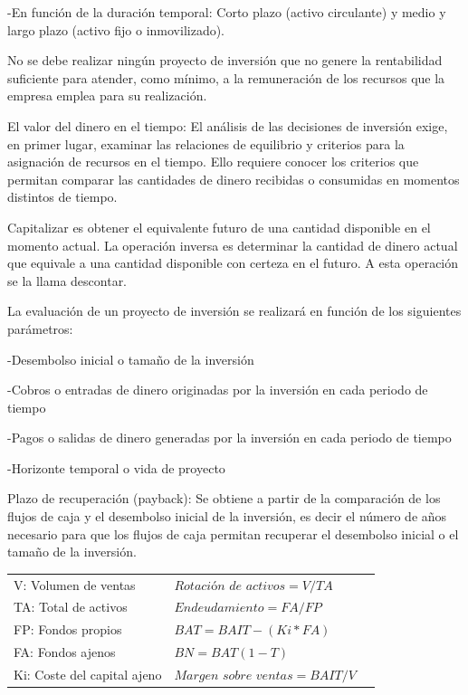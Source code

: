 \documentclass[12pt, twoside, openright]{report} %
\begin{document}
-En función de la duración temporal: Corto plazo (activo circulante) y medio y largo plazo (activo fijo o
inmovilizado).

No se debe realizar ningún proyecto de inversión que no genere la rentabilidad suficiente para atender, como
mínimo, a la remuneración de los recursos que la empresa emplea para su realización.

El valor del dinero en el tiempo: El análisis de las decisiones de inversión exige, en primer lugar, examinar
las relaciones de equilibrio y criterios para la asignación de recursos en el tiempo. Ello requiere conocer los
criterios que permitan comparar las cantidades de dinero recibidas o consumidas en momentos distintos de
tiempo.

Capitalizar es obtener el equivalente futuro de una cantidad disponible en el momento actual. La operación
inversa es determinar la cantidad de dinero actual que equivale a una cantidad disponible con certeza en el
futuro. A esta operación se la llama descontar.

La evaluación de un proyecto de inversión se realizará en función de los siguientes parámetros:

-Desembolso inicial o tamaño de la inversión

-Cobros o entradas de dinero originadas por la inversión en cada periodo de tiempo

-Pagos o salidas de dinero generadas por la inversión en cada periodo de tiempo

-Horizonte temporal o vida de proyecto
\pagebreak

Plazo de recuperación (payback): Se obtiene a partir de la comparación de los flujos de caja y el desembolso
inicial de la inversión, es decir el número de años necesario para que los flujos de caja permitan recuperar el
desembolso inicial o el tamaño de la inversión.
\begin{table}[H]
	\begin{tabular}{lll}
		V: Volumen de ventas        & $\textit{Rotación de activos} = V / TA$   \\
		TA: Total de activos        & $\textit{Endeudamiento} = FA / FP$        \\
		FP: Fondos propios          & $BAT = BAIT - (Ki * FA)$                  \\
		FA: Fondos ajenos           & $BN = BAT (1 - T)$                        \\
		Ki: Coste del capital ajeno & $\textit{Margen sobre ventas} = BAIT / V$ \\
	\end{tabular}
\end{table}
\end{document}
